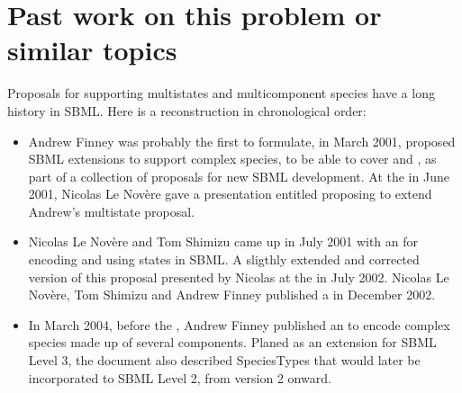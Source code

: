 \section{Past work on this problem or similar topics}

Proposals for supporting multistates and multicomponent species have a long history in SBML. Here is a reconstruction in chronological order:

\begin{itemize}
 \item Andrew Finney was probably the first to formulate, in March 2001, proposed SBML extensions to support complex species, to be able to cover  and , as part of a collection of proposals for new SBML development. At the  in June 2001, Nicolas Le Nov\`ere gave a presentation entitled  proposing to extend Andrew's multistate proposal. 

\item Nicolas Le Novère and Tom Shimizu came up in July 2001 with an  for encoding and using states in SBML. A sligthly extended and corrected version of this proposal presented by Nicolas at the  in July 2002. Nicolas Le Novère, Tom Shimizu and Andrew Finney published a  in December 2002. 

 \item In March 2004, before the , Andrew Finney published an  to encode complex species made up of several components. Planed as an extension for SBML Level 3, the document also described SpeciesTypes that would later be incorporated to SBML Level 2, from version 2 onward. 


\end{itemize}

